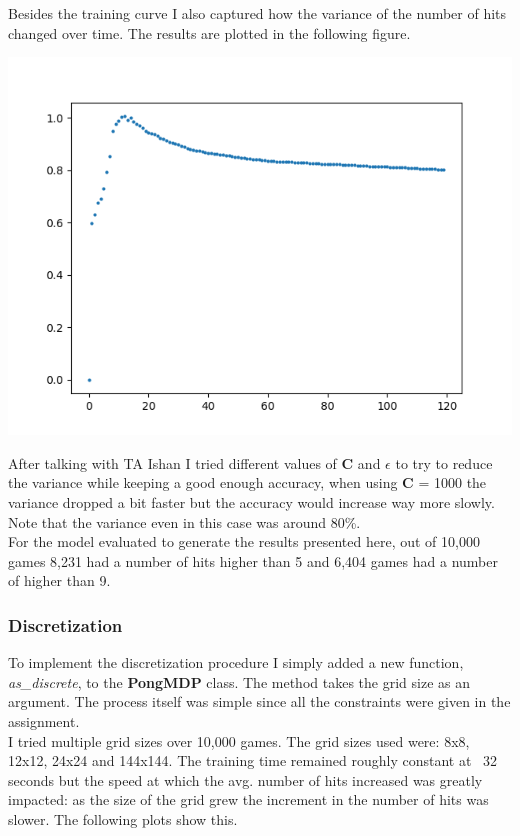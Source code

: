 \documentclass[11pt]{article}
\begin{document}
Besides the training curve I also captured how the variance of the number of hits changed over time. 
The results are plotted in the following figure.

\begin{center}
\includegraphics[scale=1]{part2.1/std.png}
\end{center}

After talking with TA Ishan I tried different values of \textbf{C} and $\epsilon$ to try to reduce the variance while keeping a good enough accuracy, when using \textbf{C} = 1000 the variance dropped a bit faster but the accuracy would increase way more slowly. Note that the variance even in this case was around 80\%. \\

For the model evaluated to generate the results presented here, out of 10,000 games 8,231 had a number of hits higher than 5 and 6,404 games had a number of higher than 9. 

\subsubsection*{Discretization}
To implement the discretization procedure I simply added a new function, \textit{as\_discrete}, to the \textbf{PongMDP} class. The method takes the grid size as an argument. The process itself was simple since all the constraints were given in the assignment. \\

I tried multiple grid sizes over 10,000 games. The grid sizes used were: 8x8, 12x12, 24x24 and 144x144. The training time remained roughly constant at ~32 seconds but the speed at which the avg. number of hits increased was greatly impacted: as the size of the grid grew the increment in the number of hits was slower. The following plots show this.
\end{document}
